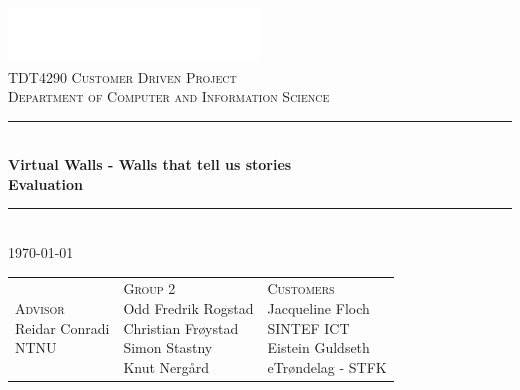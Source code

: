 \documentclass[11pt]{article}
\begin{document}
\newcommand{\fullprojectname}[0]{Virtual Walls - Walls that tell us stories}
\newcommand{\shortprojectname}[0]{Virtual Walls }
\newcommand{\systemname}[0]{StedR }
\newcommand{\wallentitys}[0]{place }
\newcommand{\wallentityp}[0]{places }
\newcommand{\wallentitypcap}[0]{Places }

\begin{titlepage}
    \color{white}
    \begin{center}
        ~
        \\[-2.5cm]

        \includegraphics[width=0.5\textwidth]{images/ntnu_logo}
        \\[0.4cm]
        \textsc{\Large TDT4290 Customer Driven Project\\
        Department of Computer and Information Science}
        \\[0.5cm]
        
        \rule{\linewidth}{0.5mm}
        \\[1cm]
        
        \textbf{\LARGE \fullprojectname\\Evaluation}
        \\[0.8cm]
        
        \rule{\linewidth}{0.5mm}
        \\[1.0cm]
        
        \Large{  \today}
        \\[1.3cm]

\begin{table}[H]
\centering
\begin{tabular}{ p{4cm} p{5cm} p{4cm} }
\parbox{4cm}{
\centering
    \color{white}
        \textsc{\Large Advisor}
        \\[0.1cm]
        \Large
        {
            Reidar Conradi\\
             \small{NTNU}
        }
} & \parbox{5cm}{
\centering
    \color{white}
        \textsc{\Large Group 2}
        \\[0.1cm]
        \Large
        {
            Odd Fredrik Rogstad \\
            Christian Frøystad \\
            Simon Stastny \\
            Knut Nergård
        }
} & \parbox{4cm}{
\centering
    \color{white}
        \textsc{\Large Customers}
        \\[0.1cm]
        \Large
        {
            Jacqueline Floch\\
            \small{SINTEF ICT}\\
            \Large{Eistein Guldseth}\\
            \small{eTrøndelag - STFK}\\
        }
}
\end{tabular}
\end{table}
        


\end{center}
\end{titlepage}
\end{document}
